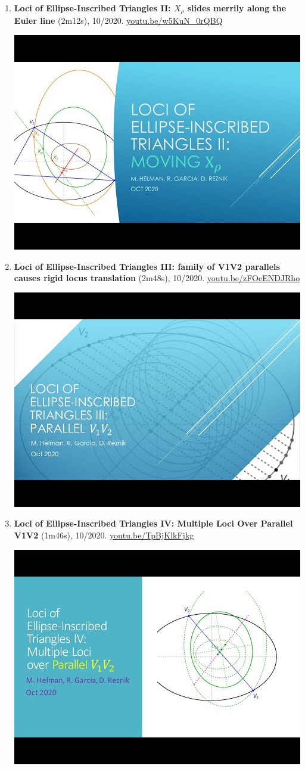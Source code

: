 \documentclass[12pt]{article}
\begin{document}
\begin{enumerate}[resume]
% 
\item \textbf{Loci of Ellipse-Inscribed Triangles II: $X_\rho$ slides merrily along the Euler line} (2m12s), 10/2020. \href{https://youtu.be/w5KuN_0rQBQ}{\url{youtu.be/w5KuN\_0rQBQ}}
\begin{center}\includegraphics[width=.5\textwidth]{pics/w5KuN_0rQBQ.jpg}\end{center}
% 
\item \textbf{Loci of Ellipse-Inscribed Triangles III: family of V1V2 parallels causes rigid locus translation} (2m48s), 10/2020. \href{https://youtu.be/zFOeENDJRho}{\url{youtu.be/zFOeENDJRho}}
\begin{center}\includegraphics[width=.5\textwidth]{pics/zFOeENDJRho.jpg}\end{center}
% 
\item \textbf{Loci of Ellipse-Inscribed Triangles IV: Multiple Loci Over Parallel V1V2} (1m46s), 10/2020. \href{https://youtu.be/TpBjKlkFjkg}{\url{youtu.be/TpBjKlkFjkg}}
\begin{center}\includegraphics[width=.5\textwidth]{pics/TpBjKlkFjkg.jpg}\end{center}

\end{enumerate}
\end{document}
